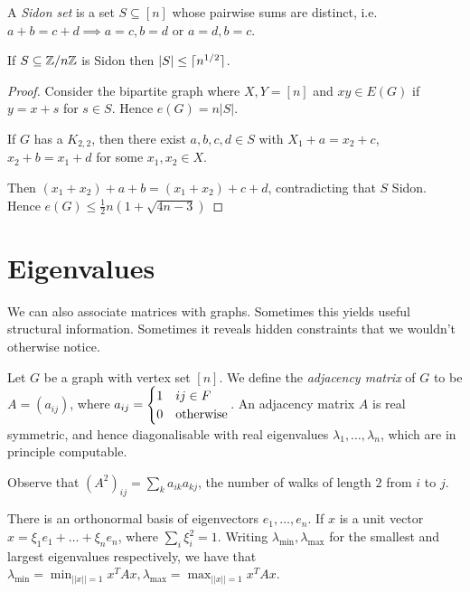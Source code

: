 \documentclass[10pt,a4paper]{article}
\begin{document}
A \emph{Sidon set} is a set $S \subseteq [n]$ whose pairwise sums are distinct, i.e. $a+b = c+d \implies a = c, b = d$ or $a=d, b=c$.

\begin{corollary}
If $S \subseteq \mathbb{Z}/n\mathbb{Z}$ is Sidon then $|S| \leq \lceil n^{1/2} \rceil$.
\end{corollary}
\begin{proof}
Consider the bipartite graph where $X,Y = [n]$ and $xy  \in E(G)$ if $y = x+s$ for $s \in S$. Hence $e(G) = n|S|$.

If $G$ has a $K_{2,2}$, then there exist $a,b,c,d \in S$ with $X_1 + a = x_2+c$, $x_2+b = x_1+d$ for some $x_1, x_2 \in X$.

Then $(x_1+ x_2) + a+b = (x_1+x_2) + c + d$, contradicting that $S$ Sidon. Hence $e(G) \leq \frac{1}{2}n (1+\sqrt{4n-3})$
\end{proof}

\section{Eigenvalues}
We can also associate matrices with graphs. Sometimes this yields useful structural information. Sometimes it reveals hidden constraints that we wouldn't otherwise notice.

Let $G$ be a graph with vertex set $[n]$. We define the \emph{adjacency matrix} of $G$ to be $A = (a_{ij})$, where $a_{ij} = \begin{cases} 1 & ij \in F \\ 0 & \text{otherwise}\end{cases}$. An adjacency matrix $A$ is real symmetric, and hence diagonalisable with real eigenvalues $\lambda_1, \ldots, \lambda_n$, which are in principle computable.

Observe that $(A^2)_{ij} = \sum_k a_{ik} a_{kj}$, the number of walks of length $2$ from $i$ to $j$.

There is an orthonormal basis of eigenvectors $e_1, \ldots, e_n$. If $x$ is a unit vector $x = \xi_1 e_1 + \ldots + \xi_n e_n$, where $\sum_i \xi_i^2 = 1$. Writing $\lambda_{\min}, \lambda_{\max}$ for the smallest and largest eigenvalues respectively, we have that $\lambda_{\min} = \min_{||x||=1}x^T Ax, \lambda_{\max} = \max_{||x||=1}x^T Ax$.
\end{document}
